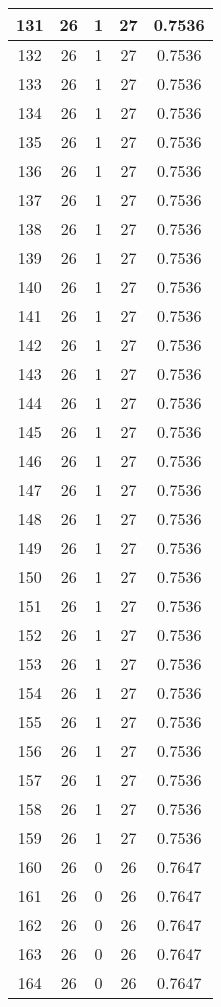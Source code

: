 \documentclass[letterpaper, 12pt]{article}
\begin{document}
\begin{longtable}{|c|c|c|c|c|}
\hline
131 & 26 & 1 & 27 & 0.7536 \\
\hline
132 & 26 & 1 & 27 & 0.7536 \\
\hline
133 & 26 & 1 & 27 & 0.7536 \\
\hline
134 & 26 & 1 & 27 & 0.7536 \\
\hline
135 & 26 & 1 & 27 & 0.7536 \\
\hline
136 & 26 & 1 & 27 & 0.7536 \\
\hline
137 & 26 & 1 & 27 & 0.7536 \\
\hline
138 & 26 & 1 & 27 & 0.7536 \\
\hline
139 & 26 & 1 & 27 & 0.7536 \\
\hline
140 & 26 & 1 & 27 & 0.7536 \\
\hline
141 & 26 & 1 & 27 & 0.7536 \\
\hline
142 & 26 & 1 & 27 & 0.7536 \\
\hline
143 & 26 & 1 & 27 & 0.7536 \\
\hline
144 & 26 & 1 & 27 & 0.7536 \\
\hline
145 & 26 & 1 & 27 & 0.7536 \\
\hline
146 & 26 & 1 & 27 & 0.7536 \\
\hline
147 & 26 & 1 & 27 & 0.7536 \\
\hline
148 & 26 & 1 & 27 & 0.7536 \\
\hline
149 & 26 & 1 & 27 & 0.7536 \\
\hline
150 & 26 & 1 & 27 & 0.7536 \\
\hline
151 & 26 & 1 & 27 & 0.7536 \\
\hline
152 & 26 & 1 & 27 & 0.7536 \\
\hline
153 & 26 & 1 & 27 & 0.7536 \\
\hline
154 & 26 & 1 & 27 & 0.7536 \\
\hline
155 & 26 & 1 & 27 & 0.7536 \\
\hline
156 & 26 & 1 & 27 & 0.7536 \\
\hline
157 & 26 & 1 & 27 & 0.7536 \\
\hline
158 & 26 & 1 & 27 & 0.7536 \\
\hline
159 & 26 & 1 & 27 & 0.7536 \\
\hline
160 & 26 & 0 & 26 & 0.7647 \\
\hline
161 & 26 & 0 & 26 & 0.7647 \\
\hline
162 & 26 & 0 & 26 & 0.7647 \\
\hline
163 & 26 & 0 & 26 & 0.7647 \\
\hline
164 & 26 & 0 & 26 & 0.7647 \\

\end{longtable}
\end{document}
